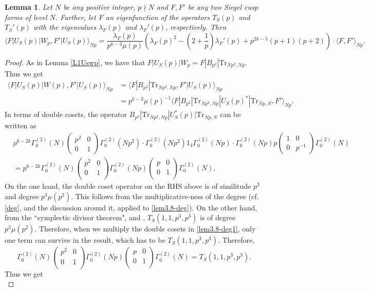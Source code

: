 \documentclass[11pt]{amsart}
\numberwithin{equation}{section}
\theoremstyle{plain}
\newtheorem{lem}[thm]{Lemma}
\theoremstyle{definition}
\newcommand{\mrm}{\mathrm}
\newcommand{\lan}{\langle }
\newcommand{\ran}{\rangle}
\newcommand{\smat}[4]{\left( \begin{smallmatrix}#1&#2\\#3&#4\end{smallmatrix}\right)}
\newcommand{\pmat}[4]{\begin{pmatrix} #1 & #2 \\ #3 & #4 \\ \end{pmatrix} }
\begin{document}
\begin{lem}
    Let $N$ be any positive integer, $p\nmid N$ and $F,F'$ be any two Siegel cusp forms of level $N$. Further, let $F$ an eigenfunction of the operators $T_S(p)$ and $T_S'(p)$ with the eigenvalues $\lambda_F(p)$ and $\lambda_F'(p)$, respectively. Then
    \begin{equation}
        \lan F|U_S(p)|W_p, F'|U_S(p) \ran_{Np}= \frac{\lambda_F(p)}{p^{k-3}\mu(p)}\left(\lambda_F(p)^2- (2+\frac{1}{p})\lambda_F'(p) +p^{2k-5}(p+1)(p+2) \right)\cdot \lan F,F' \ran_{Np}.
    \end{equation}
\end{lem}
\begin{proof}
    As in Lemma \ref{L1Uswp}, we have that $F|U_S(p)|W_p= F|B_{p^2}| \mrm{Tr}_{Np^2,Np} $. Thus we get
    \begin{align}
    \lan F|U_S(p)|W(p), F'|U_S(p) \ran_{Np} &= \lan F|B_{p^2}| \mrm{Tr}_{Np^2,Np}, F' |U_S(p)\ran_{Np} \\
    &=   p^{k-3}\mu(p)^{-1} \lan F|B_{p^2}| \mrm{Tr}_{Np^2,Np}|U_S(p)^*|\mrm{Tr}_{Np,N} , F' \ran_{Np}.
\end{align}
In terms of double cosets, the operator $B_{p^2}| \mrm{Tr}_{Np^2,Np}|U_S^*(p)|\mrm{Tr}_{Np,N}$ can be written as
 \begin{align}
     &p^{6-2k} \Gamma^{(2)}_0(N) \smat{p^2}{0}{0}{1} \Gamma^{(2)}_0(Np^2) \cdot \Gamma^{(2)}_0(Np^2) 1_4 \Gamma^{(2)}_0(Np)\cdot \Gamma^{(2)}_0(Np) p \smat{1}{0}{0}{p^{-1} }\Gamma^{(2)}_0(N) \label{lem3.8-deg}\\
     &= p^{6-2k} \Gamma^{(2)}_0(N) \pmat{p^2}{0}{0}{1}\Gamma^{(2)}_0(Np)\pmat{p}{0}{0}{1} \Gamma^{(2)}_0(N). \label{lem3.8-deg1}
 \end{align}
 On the one hand, the double coset operator on the RHS above is of similitude $p^3$ and degree $p^3 \mu(p^2)$. This follows from the multiplicative-ness of the degree (cf. \eqref{deg}, and the discussion around it, applied to \eqref{lem3.8-deg}). On the other hand, from the ``symplectic divisor theorem", and \cite[Chap.~7, Cor.~7.3]{krieg1990hecke}, $T_S(1,1,p^3,p^3)$ is of degree $p^3 \mu(p^2)$. Therefore, when we multiply the double cosets in \eqref{lem3.8-deg1}, only one term can survive in the result, which has to be $T_S(1,1,p^3,p^3)$. Therefore,
 \begin{equation}
     \Gamma^{(2)}_0(N) \pmat{p^2}{0}{0}{1}\Gamma^{(2)}_0(Np)\pmat{p}{0}{0}{1} \Gamma^{(2)}_0(N) = T_S(1,1,p^3,p^3).
 \end{equation}
 Thus we get
\begin{equation}\label{USWpUS*TSp3}

\end{equation}
\end{proof}
\end{document}
